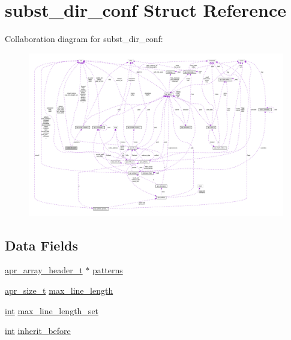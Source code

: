 \hypertarget{structsubst__dir__conf}{}\section{subst\+\_\+dir\+\_\+conf Struct Reference}
\label{structsubst__dir__conf}


Collaboration diagram for subst\+\_\+dir\+\_\+conf\+:
\nopagebreak
\begin{figure}[H]
\begin{center}
\leavevmode
\includegraphics[width=350pt]{structsubst__dir__conf__coll__graph}
\end{center}
\end{figure}
\subsection*{Data Fields}
\begin{DoxyCompactItemize}
\item 
\hyperlink{structapr__array__header__t}{apr\+\_\+array\+\_\+header\+\_\+t} $\ast$ \hyperlink{structsubst__dir__conf_a09456624d687f9cf84cb0295ee328947}{patterns}
\item 
\hyperlink{group__apr__platform_gaaa72b2253f6f3032cefea5712a27540e}{apr\+\_\+size\+\_\+t} \hyperlink{structsubst__dir__conf_a82e5b8db66214b799578439e6cb07f9f}{max\+\_\+line\+\_\+length}
\item 
\hyperlink{pcre_8txt_a42dfa4ff673c82d8efe7144098fbc198}{int} \hyperlink{structsubst__dir__conf_a375e7df9a1786d0412349d4dc5993143}{max\+\_\+line\+\_\+length\+\_\+set}
\item 
\hyperlink{pcre_8txt_a42dfa4ff673c82d8efe7144098fbc198}{int} \hyperlink{structsubst__dir__conf_a033b598bc3842f87bac799015508460a}{inherit\+\_\+before}
\end{DoxyCompactItemize}


